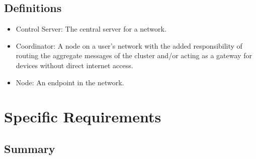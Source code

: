 \documentclass[tikz,a4paper,titlepage]{article}
\begin{document}
\subsection{Definitions}
\begin{itemize}
    \item Control Server: The central server for a network.
    \item Coordinator: A node on a user's network with the added responsibility of routing the aggregate messages of the cluster and/or acting as a gateway for devices without direct internet access.
    \item Node: An endpoint in the network.
\end{itemize}


%
%

\section{Specific Requirements}

\subsection{Summary}
\end{document}
